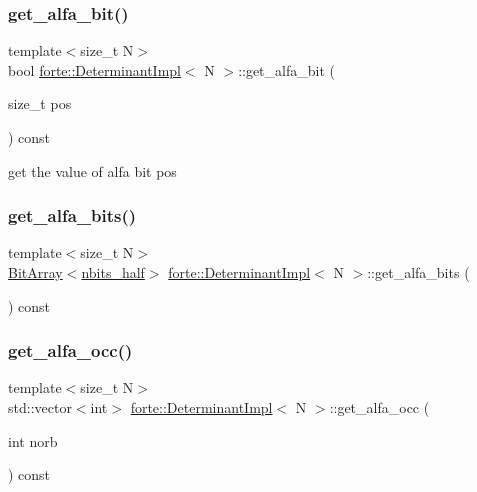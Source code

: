 \subsubsection{\texorpdfstring{get\+\_\+alfa\+\_\+bit()}{get\_alfa\_bit()}}
{\footnotesize\ttfamily template$<$size\+\_\+t N$>$ \\
bool \mbox{\hyperlink{classforte_1_1_determinant_impl}{forte\+::\+Determinant\+Impl}}$<$ N $>$\+::get\+\_\+alfa\+\_\+bit (\begin{DoxyParamCaption}\item[{size\+\_\+t}]{pos }\end{DoxyParamCaption}) const\hspace{0.3cm}{\ttfamily [inline]}}



get the value of alfa bit pos 

\mbox{\label{classforte_1_1_determinant_impl_a29ea8ae7c2f083aaa959d9f6f1de9d3c}} 
\subsubsection{\texorpdfstring{get\+\_\+alfa\+\_\+bits()}{get\_alfa\_bits()}}
{\footnotesize\ttfamily template$<$size\+\_\+t N$>$ \\
\mbox{\hyperlink{classforte_1_1_bit_array}{Bit\+Array}}$<$\mbox{\hyperlink{classforte_1_1_determinant_impl_ac8d2a64c2fb785ccb79b1cecc553d63d}{nbits\+\_\+half}}$>$ \mbox{\hyperlink{classforte_1_1_determinant_impl}{forte\+::\+Determinant\+Impl}}$<$ N $>$\+::get\+\_\+alfa\+\_\+bits (\begin{DoxyParamCaption}{ }\end{DoxyParamCaption}) const\hspace{0.3cm}{\ttfamily [inline]}}

\mbox{\label{classforte_1_1_determinant_impl_afb3ba3c94638a83e137e5ee275bc7001}} 
\subsubsection{\texorpdfstring{get\+\_\+alfa\+\_\+occ()}{get\_alfa\_occ()}}
{\footnotesize\ttfamily template$<$size\+\_\+t N$>$ \\
std\+::vector$<$int$>$ \mbox{\hyperlink{classforte_1_1_determinant_impl}{forte\+::\+Determinant\+Impl}}$<$ N $>$\+::get\+\_\+alfa\+\_\+occ (\begin{DoxyParamCaption}\item[{int}]{norb }\end{DoxyParamCaption}) const\hspace{0.3cm}{\ttfamily [inline]}}



